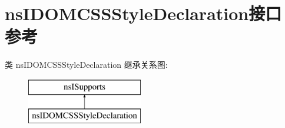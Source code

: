 \hypertarget{interfacens_i_d_o_m_c_s_s_style_declaration}{}\section{ns\+I\+D\+O\+M\+C\+S\+S\+Style\+Declaration接口 参考}
\label{interfacens_i_d_o_m_c_s_s_style_declaration}
类 ns\+I\+D\+O\+M\+C\+S\+S\+Style\+Declaration 继承关系图\+:\begin{figure}[H]
\begin{center}
\leavevmode
\includegraphics[height=2.000000cm]{interfacens_i_d_o_m_c_s_s_style_declaration}
\end{center}
\end{figure}
